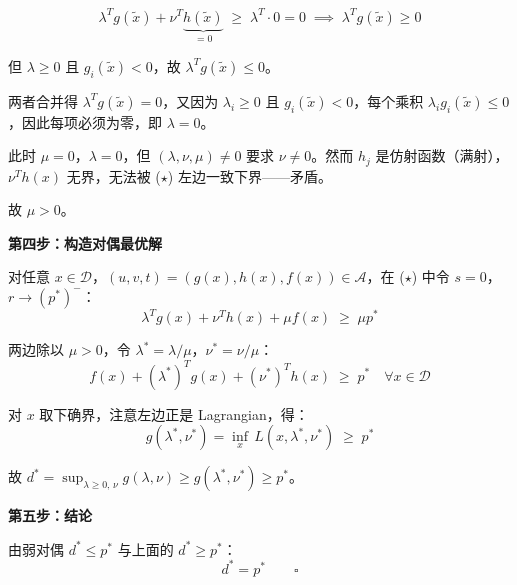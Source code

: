 \documentclass[12pt, a4paper]{ctexart}
\begin{document}
\begin{blackboard}
\[
\lambda^T g(\tilde{x}) + \nu^T \underbrace{h(\tilde{x})}_{=0} \;\geq\; \lambda^T \cdot 0 = 0
\;\implies\;
\lambda^T g(\tilde{x}) \geq 0
\]

但 $\lambda \geq 0$ 且 $g_i(\tilde{x}) < 0$，故 $\lambda^T g(\tilde{x}) \leq 0$。

两者合并得 $\lambda^T g(\tilde{x}) = 0$，又因为 $\lambda_i \geq 0$ 且 $g_i(\tilde{x}) < 0$，每个乘积 $\lambda_i g_i(\tilde{x}) \leq 0$，因此每项必须为零，即 $\lambda = 0$。

此时 $\mu = 0$，$\lambda = 0$，但 $(\lambda, \nu, \mu) \neq 0$ 要求 $\nu \neq 0$。然而 $h_j$ 是仿射函数（满射），$\nu^T h(x)$ 无界，无法被 ($\star$) 左边一致下界——矛盾。

故 $\mu > 0$。

\textbf{第四步：构造对偶最优解}

对任意 $x \in \mathcal{D}$，$(u,v,t) = (g(x),h(x),f(x)) \in \mathcal{A}$，在 ($\star$) 中令 $s = 0$，$r \to (p^*)^-$：
\[
\lambda^T g(x) + \nu^T h(x) + \mu f(x) \;\geq\; \mu p^*
\]

两边除以 $\mu > 0$，令 $\lambda^* = \lambda/\mu$，$\nu^* = \nu/\mu$：
\[
f(x) + (\lambda^*)^T g(x) + (\nu^*)^T h(x) \;\geq\; p^* \quad \forall x \in \mathcal{D}
\]

对 $x$ 取下确界，注意左边正是 Lagrangian，得：
\[
g(\lambda^*, \nu^*) = \inf_x\, L(x, \lambda^*, \nu^*) \;\geq\; p^*
\]

故 $d^* = \sup_{\lambda \geq 0,\, \nu} g(\lambda, \nu) \geq g(\lambda^*, \nu^*) \geq p^*$。

\textbf{第五步：结论}

由弱对偶 $d^* \leq p^*$ 与上面的 $d^* \geq p^*$：
\[
\boxed{d^* = p^*} \qquad \square
\]

\end{blackboard}
\end{document}
